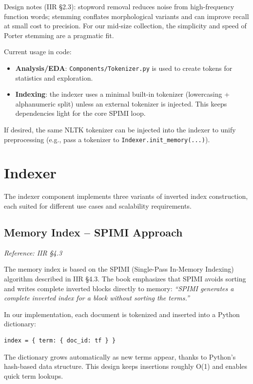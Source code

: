 \documentclass[11pt,a4paper]{article}
\begin{document}
Design notes (IIR \S2.3): stopword removal reduces noise from high-frequency function words; stemming conflates morphological variants and can improve recall at small cost to precision. For our mid-size collection, the simplicity and speed of Porter stemming are a pragmatic fit.

Current usage in code:
\begin{itemize}
    \item \textbf{Analysis/EDA}: \texttt{Components/Tokenizer.py} is used to create tokens for statistics and exploration.
    \item \textbf{Indexing}: the indexer uses a minimal built-in tokenizer (lowercasing + alphanumeric split) unless an external tokenizer is injected. This keeps dependencies light for the core SPIMI loop.
\end{itemize}

If desired, the same NLTK tokenizer can be injected into the indexer to unify preprocessing (e.g., pass a tokenizer to \texttt{Indexer.init\_memory(...)}).

\section{Indexer}
\label{sec:indexer}

The indexer component implements three variants of inverted index construction, each suited for different use cases and scalability requirements.

\subsection{Memory Index – SPIMI Approach}
\label{subsec:memory}
\textit{Reference: IIR §4.3}

The memory index is based on the SPIMI (Single-Pass In-Memory Indexing) algorithm described in IIR §4.3.  
The book emphasizes that SPIMI avoids sorting and writes complete inverted blocks directly to memory:  
\textit{“SPIMI generates a complete inverted index for a block without sorting the terms.”}

In our implementation, each document is tokenized and inserted into a Python dictionary:
\begin{verbatim}
index = { term: { doc_id: tf } }
\end{verbatim}

The dictionary grows automatically as new terms appear, thanks to Python’s hash-based data structure.
This design keeps insertions roughly O(1) and enables quick term lookups.
\end{document}

